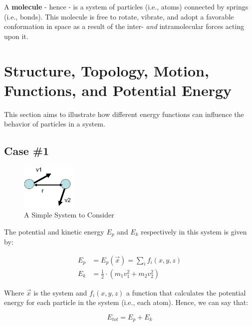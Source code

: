 \documentclass[
  letterpaper,
  DIV=11,
  numbers=noendperiod]{scrreprt}
\begin{document}
A \textbf{molecule} - hence - is a system of particles (i.e., atoms)
connected by springs (i.e., bonds). This molecule is free to rotate,
vibrate, and adopt a favorable conformation in space as a result of the
inter- \emph{and} intramolecular forces acting upon it.

\hypertarget{structure-topology-motion-functions-and-potential-energy}{%
\section{Structure, Topology, Motion, Functions, and Potential
Energy}\label{structure-topology-motion-functions-and-potential-energy}}

This section aims to illustrate how different energy functions can
influence the behavior of particles in a system.

\hypertarget{case-1}{%
\subsection{Case \#1}\label{case-1}}

\begin{figure}

{\centering \includegraphics[width=1.04in,height=\textheight]{./images/wk1/system.jpg}

}

\caption{A Simple System to Consider}

\end{figure}

The potential and kinetic energy \(E_p\) and \(E_k\) respectively in
this system is given by:

\begin{align}
  E_p &= E_p(\vec{x}) = \sum_{i}f_i(x, y, z) \\ 
  E_k &= \frac{1}{2} \cdot (m_1v_1^2 + m_2v_2^2) 
\end{align}

Where \(\vec{x}\) is the system and \(f_i(x, y, z)\) a function that
calculates the potential energy for each particle in the system (i.e.,
each atom). Hence, we can say that:

\begin{equation}
  E_{tot} = E_p + E_k
\end{equation}
\end{document}
